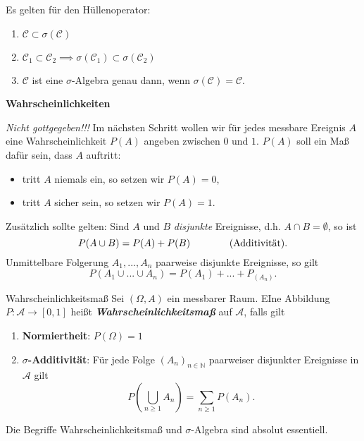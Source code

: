 \documentclass[a4paper, landscape,twocolumn,fontsize=9pt]{scrartcl}
\newcommand{\vip}[1]{\textit{\textbf{#1}}}
\begin{document}
Es gelten für den Hüllenoperator:
\begin{enumerate}
	\item $\mathcal C \subset \sigma(\mathcal C)$
	\item $\mathcal C_1 \subset \mathcal C_2 \implies \sigma(\mathcal C_1) \subset \sigma(\mathcal C_2)$
	\item $\mathcal C$ ist eine $\sigma$-Algebra genau dann, wenn $\sigma(\mathcal C) = \mathcal C$.
\end{enumerate}

\textbf{Wahrscheinlichkeiten}

\textit{Nicht gottgegeben!!!} Im nächsten Schritt wollen wir für jedes messbare Ereignis $A$ eine Wahrscheinlichkeit $P(A)$ angeben zwischen $0$ und $1$. $P(A)$ soll ein Maß dafür sein, dass $A$ auftritt:
\begin{itemize}
	\item tritt $A$ niemals ein, so setzen wir $P(A) = 0$,
	\item tritt $A$ sicher sein, so setzen wir $P(A) = 1$.
\end{itemize}
Zusätzlich sollte gelten: Sind $A$ und $B$ \emph{disjunkte} Ereignisse, d.h. $A \cap B = \emptyset$, so ist \begin{equation*}P (A \cup B) = P(A) + P(B) \qquad \tag{{Additivität}}.\end{equation*}
Unmittelbare Folgerung $A_1,...,A_n$ paarweise disjunkte Ereignisse, so gilt
\[
	P(A_1 \cup ... \cup A_n) = P(A_1) + ... + P_(A_n).
\]

\begin{definition}{Wahrscheinlichkeitsmaß}{}
Sei $(\Omega, A)$ ein messbarer Raum. EIne Abbildung $P: \mathcal A \to [0,1]$ heißt \vip{Wahrscheinlichkeitsmaß} auf $\mathcal A$, falls gilt
\begin{enumerate}
	\item \textbf{Normiertheit}: $P(\Omega) = 1$
	\item \textbf{$\sigma$-Additivität}: Für jede Folge $(A_n)_{n \in \mathbb N}$ paarweiser disjunkter Ereignisse in $\mathcal A$ gilt
	\[
		P(\bigcup_{n \geq 1}A_n) = \sum_{n \geq 1} P(A_n).
	\]
\end{enumerate}
\end{definition}

Die Begriffe Wahrscheinlichkeitsmaß und $\sigma$-Algebra sind absolut essentiell.
\end{document}
